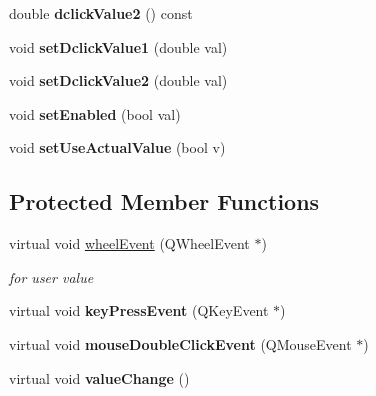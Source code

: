 \begin{DoxyCompactItemize}
double {\bfseries dclick\+Value2} () const
\item 
\mbox{\label{class_awl_1_1_abstract_slider_ab9e5839c615b82dfe5beacba4ee46fe7}} 
void {\bfseries set\+Dclick\+Value1} (double val)
\item 
\mbox{\label{class_awl_1_1_abstract_slider_a897cb2e30fab84f9c7c74cc4d5f2bc6d}} 
void {\bfseries set\+Dclick\+Value2} (double val)
\item 
\mbox{\label{class_awl_1_1_abstract_slider_a372bd918faa9d9e1bbfff5b2e8059237}} 
void {\bfseries set\+Enabled} (bool val)
\item 
\mbox{\label{class_awl_1_1_abstract_slider_afdc2de107fa611d3f5f398f6ae668977}} 
void {\bfseries set\+Use\+Actual\+Value} (bool v)
\end{DoxyCompactItemize}
\subsection*{Protected Member Functions}
\begin{DoxyCompactItemize}
\item 
\mbox{\label{class_awl_1_1_abstract_slider_ae3b5f679bb08992dd70695303bbf8522}} 
virtual void \hyperlink{class_awl_1_1_abstract_slider_ae3b5f679bb08992dd70695303bbf8522}{wheel\+Event} (Q\+Wheel\+Event $\ast$)
\begin{DoxyCompactList}\small\item\em for user value \end{DoxyCompactList}\item 
\mbox{\label{class_awl_1_1_abstract_slider_ad7758e7e9941b22ed0f9cf6a766cb1e9}} 
virtual void {\bfseries key\+Press\+Event} (Q\+Key\+Event $\ast$)
\item 
\mbox{\label{class_awl_1_1_abstract_slider_a188186183d37b92a6bafb9bb69c86c02}} 
virtual void {\bfseries mouse\+Double\+Click\+Event} (Q\+Mouse\+Event $\ast$)
\item 
\mbox{\label{class_awl_1_1_abstract_slider_a14ae2b7f69614802bba1a56d11043d51}} 
virtual void {\bfseries value\+Change} ()
\end{DoxyCompactItemize}
